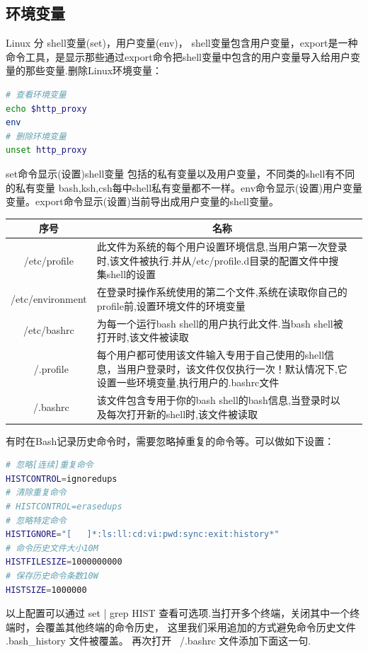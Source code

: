 \documentclass[letter]{book}
\begin{document}
\subsection{环境变量}

Linux 分 shell变量(set)，用户变量(env)， shell变量包含用户变量，export是一种命令工具，是显示那些通过export命令把shell变量中包含的用户变量导入给用户变量的那些变量.删除Linux环境变量：

\begin{lstlisting}[language=Bash]
# 查看环境变量
echo $http_proxy
env
# 删除环境变量
unset http_proxy
\end{lstlisting}

set命令显示(设置)shell变量 包括的私有变量以及用户变量，不同类的shell有不同的私有变量 bash,ksh,csh每中shell私有变量都不一样。env命令显示(设置)用户变量变量。export命令显示(设置)当前导出成用户变量的shell变量。

\begin{tabular}{cp{8cm}c}
	\hline
	\multirow{1}{*}{序号}
	& \multicolumn{1}{c}{名称}  \\
	\hline			
	/etc/profile  & 此文件为系统的每个用户设置环境信息,当用户第一次登录时,该文件被执行.并从/etc/profile.d目录的配置文件中搜集shell的设置 \\	
	/etc/environment & 在登录时操作系统使用的第二个文件,系统在读取你自己的profile前,设置环境文件的环境变量 \\
	/etc/bashrc & 为每一个运行bash shell的用户执行此文件.当bash shell被打开时,该文件被读取\\
	~/.profile & 每个用户都可使用该文件输入专用于自己使用的shell信息，当用户登录时，该文件仅仅执行一次！默认情况下,它设置一些环境变量,执行用户的.bashrc文件\\
	~/.bashrc &  该文件包含专用于你的bash shell的bash信息,当登录时以及每次打开新的shell时,该文件被读取\\
	\hline
\end{tabular}

有时在Bash记录历史命令时，需要忽略掉重复的命令等。可以做如下设置：

\begin{lstlisting}[language=Bash]
# 忽略[连续]重复命令
HISTCONTROL=ignoredups
# 清除重复命令
# HISTCONTROL=erasedups
# 忽略特定命令
HISTIGNORE="[   ]*:ls:ll:cd:vi:pwd:sync:exit:history*"
# 命令历史文件大小10M
HISTFILESIZE=1000000000
# 保存历史命令条数10W
HISTSIZE=1000000
\end{lstlisting}

以上配置可以通过 set | grep HIST 查看可选项.当打开多个终端，关闭其中一个终端时，会覆盖其他终端的命令历史， 这里我们采用追加的方式避免命令历史文件 .bash\_history 文件被覆盖。 再次打开 ~/.bashrc 文件添加下面这一句.
\end{document}
